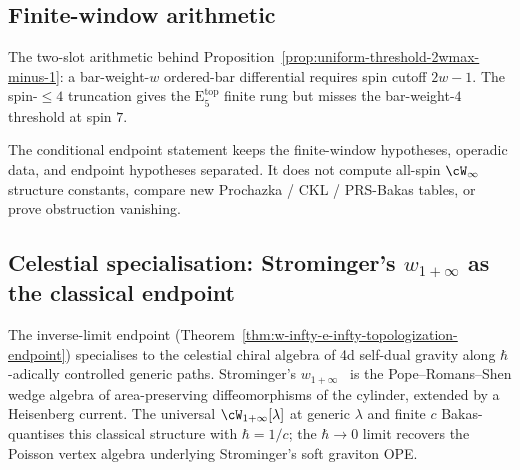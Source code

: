 \subsection{Finite-window arithmetic}
\label{subsec:w-infty-endpoint-tests}

The two-slot arithmetic behind
Proposition~\ref{prop:uniform-threshold-2wmax-minus-1}: a
bar-weight-\(w\) ordered-bar differential requires spin cutoff
\(2w-1\). The spin-\(\le 4\) truncation gives the
\(\mathrm{E}_5^{\mathrm{top}}\) finite rung but misses the
bar-weight-\(4\) threshold at spin \(7\).

The conditional endpoint statement keeps the finite-window
hypotheses, operadic data, and endpoint hypotheses separated. It does
not compute
all-spin \(\cW_\infty\) structure constants, compare new
Prochazka / CKL / PRS-Bakas tables, or prove obstruction
vanishing.

\providecommand{\wtc}{\mathfrak{w}_{1+\infty}}

\subsection{Celestial specialisation: Strominger's
\texorpdfstring{$w_{1+\infty}$}{w1+infty} as the classical endpoint}
\label{subsec:celestial-specialisation-strominger}

The inverse-limit endpoint
(Theorem~\ref{thm:w-infty-e-infty-topologization-endpoint})
specialises to the celestial chiral algebra of 4d self-dual
gravity along \(\hbar\)-adically controlled generic paths.
Strominger's $w_{1+\infty}$~\cite{StromingerWInfinityCelestial} is
the Pope--Romans--Shen wedge algebra of area-preserving
diffeomorphisms of the cylinder, extended by a Heisenberg current.
The universal $\cW_{1+\infty}[\lambda]$ at generic $\lambda$ and
finite $c$ Bakas-quantises this classical structure with
$\hbar = 1/c$; the $\hbar\to 0$ limit recovers the Poisson vertex
algebra underlying Strominger's soft graviton OPE.


